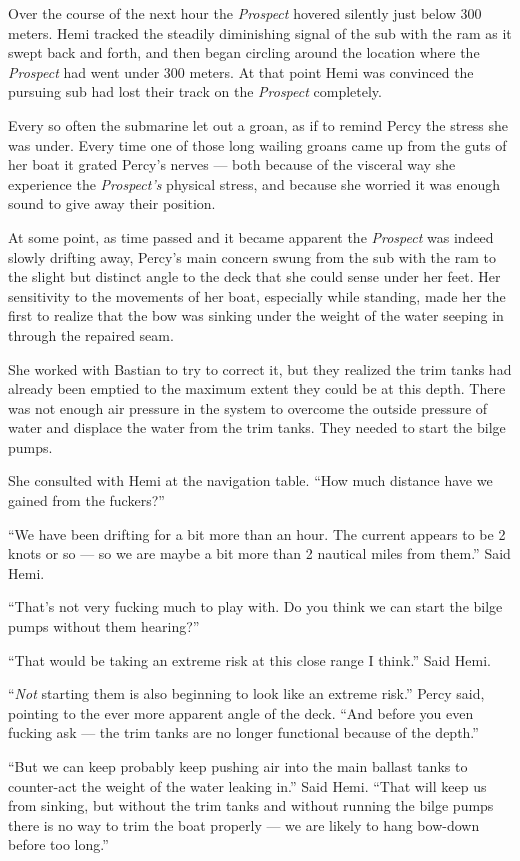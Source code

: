 \documentclass[
]{scrbook}
\begin{document}
Over the course of the next hour the \emph{Prospect} hovered silently
just below 300 meters. Hemi tracked the steadily diminishing signal of
the sub with the ram as it swept back and forth, and then began circling
around the location where the \emph{Prospect} had went under 300 meters.
At that point Hemi was convinced the pursuing sub had lost their track
on the \emph{Prospect} completely.

Every so often the submarine let out a groan, as if to remind Percy the
stress she was under. Every time one of those long wailing groans came
up from the guts of her boat it grated Percy's nerves --- both because
of the visceral way she experience the \emph{Prospect's} physical
stress, and because she worried it was enough sound to give away their
position.

At some point, as time passed and it became apparent the \emph{Prospect}
was indeed slowly drifting away, Percy's main concern swung from the sub
with the ram to the slight but distinct angle to the deck that she could
sense under her feet. Her sensitivity to the movements of her boat,
especially while standing, made her the first to realize that the bow
was sinking under the weight of the water seeping in through the
repaired seam.

She worked with Bastian to try to correct it, but they realized the trim
tanks had already been emptied to the maximum extent they could be at
this depth. There was not enough air pressure in the system to overcome
the outside pressure of water and displace the water from the trim
tanks. They needed to start the bilge pumps.

She consulted with Hemi at the navigation table. ``How much distance
have we gained from the fuckers?''

``We have been drifting for a bit more than an hour. The current appears
to be 2 knots or so --- so we are maybe a bit more than 2 nautical miles
from them.'' Said Hemi.

``That's not very fucking much to play with. Do you think we can start
the bilge pumps without them hearing?''

``That would be taking an extreme risk at this close range I think.''
Said Hemi.

``\emph{Not} starting them is also beginning to look like an extreme
risk.'' Percy said, pointing to the ever more apparent angle of the
deck. ``And before you even fucking ask --- the trim tanks are no longer
functional because of the depth.''

``But we can keep probably keep pushing air into the main ballast tanks
to counter-act the weight of the water leaking in.'' Said Hemi. ``That
will keep us from sinking, but without the trim tanks and without
running the bilge pumps there is no way to trim the boat properly --- we
are likely to hang bow-down before too long.''
\end{document}
